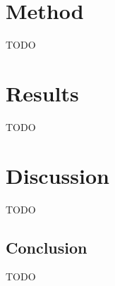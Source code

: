\documentclass[11pt,twocolumn]{article}
\begin{document}
\section{Method}

TODO

\section{Results}

TODO

\section{Discussion}

TODO

\subsection{Conclusion}

TODO
\end{document}
